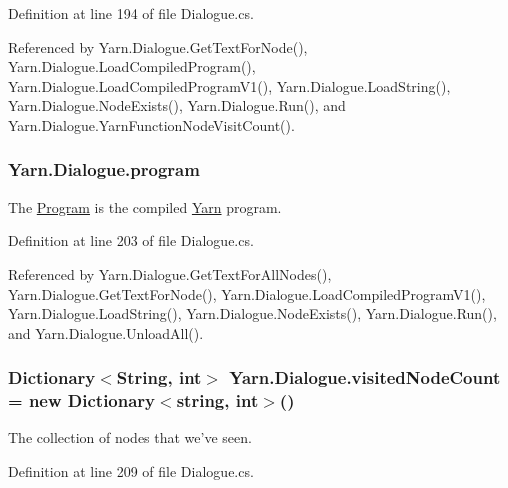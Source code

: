 Definition at line 194 of file Dialogue.\-cs.



Referenced by Yarn.\-Dialogue.\-Get\-Text\-For\-Node(), Yarn.\-Dialogue.\-Load\-Compiled\-Program(), Yarn.\-Dialogue.\-Load\-Compiled\-Program\-V1(), Yarn.\-Dialogue.\-Load\-String(), Yarn.\-Dialogue.\-Node\-Exists(), Yarn.\-Dialogue.\-Run(), and Yarn.\-Dialogue.\-Yarn\-Function\-Node\-Visit\-Count().

\hypertarget{a00092_a0a1cca92325f430425d784d416cb5c2b}{
\subsubsection[{program}]{ Yarn.\-Dialogue.\-program\hspace{0.3cm}{\ttfamily [package]}}}\label{a00092_a0a1cca92325f430425d784d416cb5c2b}


The \hyperlink{a00152}{Program} is the compiled \hyperlink{a00051}{Yarn} program. 



Definition at line 203 of file Dialogue.\-cs.



Referenced by Yarn.\-Dialogue.\-Get\-Text\-For\-All\-Nodes(), Yarn.\-Dialogue.\-Get\-Text\-For\-Node(), Yarn.\-Dialogue.\-Load\-Compiled\-Program\-V1(), Yarn.\-Dialogue.\-Load\-String(), Yarn.\-Dialogue.\-Node\-Exists(), Yarn.\-Dialogue.\-Run(), and Yarn.\-Dialogue.\-Unload\-All().

\hypertarget{a00092_aae9e64354066a1e2fa130629959d772b}{
\subsubsection[{visited\-Node\-Count}]{\setlength{\rightskip}{0pt plus 5cm}Dictionary$<${\bf String}, int$>$ Yarn.\-Dialogue.\-visited\-Node\-Count = new Dictionary$<$string, int$>$()}}\label{a00092_aae9e64354066a1e2fa130629959d772b}


The collection of nodes that we've seen. 



Definition at line 209 of file Dialogue.\-cs.



